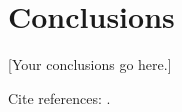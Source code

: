 \chapter*{Conclusions}
\label{ch:conclusion}

[Your conclusions go here.]

Cite references: \cite{Wolman1941-or, Wolman1971-zi, Wolman1976-ym, Wolman1981-fp, Wolman1984-od}. 
